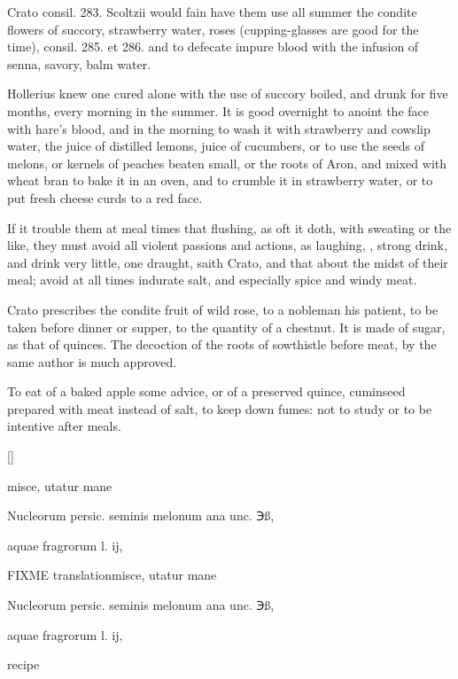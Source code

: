 Crato \textlatin{consil. 283. Scoltzii} would fain have them use all summer
the condite flowers of succory, strawberry water, roses
(cupping-glasses are good for the time), consil. 285. et 286. and to
defecate impure blood with the infusion of senna, savory, balm water.

Hollerius knew one cured alone with the use of succory boiled,
and drunk for five months, every morning in the summer. It is
good overnight to anoint the face with hare's blood, and in the morning
to wash it with strawberry and cowslip water, the juice of distilled
lemons, juice of cucumbers, or to use the seeds of melons, or kernels
of peaches beaten small, or the roots of Aron, and mixed with wheat
bran to bake it in an oven, and to crumble it in strawberry water,
 or to put fresh cheese curds to a red face.

If it trouble them at meal times that flushing, as oft it doth, with
sweating or the like, they must avoid all violent passions and actions,
as laughing, \etc{}, strong drink, and drink very little, one
draught, saith Crato, and that about the midst of their meal; avoid at
all times indurate salt, and especially spice and windy meat.

Crato prescribes the condite fruit of wild rose, to a nobleman
his patient, to be taken before dinner or supper, to the quantity of a
chestnut. It is made of sugar, as that of quinces. The decoction of the
roots of sowthistle before meat, by the same author is much approved.

To eat of a baked apple some advice, or of a preserved quince,
cuminseed prepared with meat instead of salt, to keep down fumes: not
to study or to be intentive after meals.

\begin{Prescription}[H]
[\baselineskip]
\begin{prescriptionbox}{}{\textlatin{misce, utatur mane}}
\item \textlatin{Nucleorum persic. seminis melonum ana unc. ℈ß},
\item \textlatin{aquae fragrorum l. ij},
\end{prescriptionbox}
\begin{prescriptionbox}{FIXME translation}{\textlatin{misce, utatur mane}}
\item \textlatin{Nucleorum persic. seminis melonum ana unc. ℈ß},
\item \textlatin{aquae fragrorum l. ij},
\end{prescriptionbox}
\caption{ recipe}
\end{Prescription}

